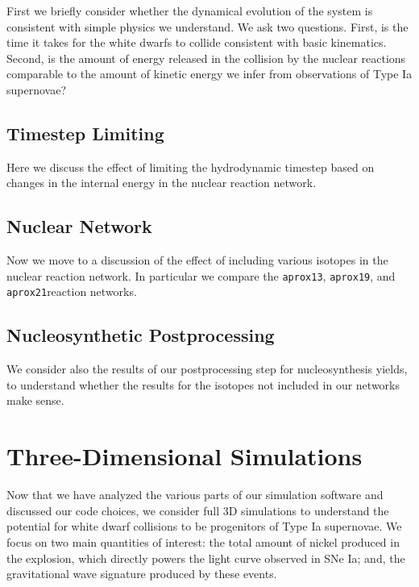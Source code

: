 \documentclass[twocolumn,numberedappendix]{../aastex6}
\newcommand{\aproxthirteen}{\texttt{aprox13}}
\newcommand{\aproxnineteen}{\texttt{aprox19}}
\newcommand{\aproxtwentyone}{\texttt{aprox21}}
\begin{document}
First we briefly consider whether the dynamical evolution of the system
is consistent with simple physics we understand. We ask two questions.
First, is the time it takes for the white dwarfs to collide consistent with
basic kinematics. Second, is the amount of energy released in the
collision by the nuclear reactions comparable to the amount of kinetic
energy we infer from observations of Type Ia supernovae?

\subsection{Timestep Limiting}
\label{sec:2D:timestep}

Here we discuss the effect of limiting the hydrodynamic timestep based on
changes in the internal energy in the nuclear reaction network.

\subsection{Nuclear Network}
\label{sec:2D:network}

Now we move to a discussion of the effect of including various isotopes
in the nuclear reaction network. In particular we compare the \aproxthirteen,
\aproxnineteen, and \aproxtwentyone reaction networks.

\subsection{Nucleosynthetic Postprocessing}
\label{sec:2D:postprocessing}

We consider also the results of our postprocessing step for nucleosynthesis
yields, to understand whether the results for the isotopes not included in
our networks make sense.



\section{Three-Dimensional Simulations}
\label{sec:3D}

Now that we have analyzed the various parts of our simulation software and
discussed our code choices, we consider full 3D simulations to understand
the potential for white dwarf collisions to be progenitors of Type Ia
supernovae. We focus on two main quantities of interest: the total amount of
nickel produced in the explosion, which directly powers the light curve
observed in SNe Ia; and, the gravitational wave signature produced by
these events.
\end{document}
